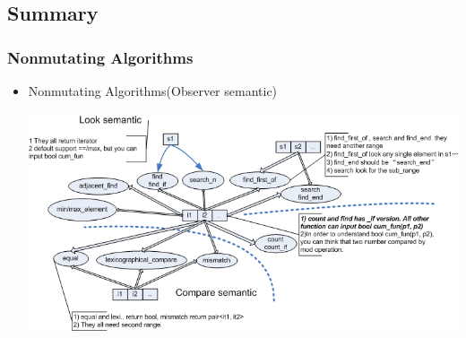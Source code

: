 \documentclass[a4paper,11pt,twoside]{book}
\begin{document}
\subsection{Summary}
\subsubsection{Nonmutating Algorithms}
\begin{itemize}
	\item Nonmutating Algorithms(Observer semantic)
	\begin{center}
		\includegraphics[width=0.85\linewidth]{pics/stl1.png}
	\end{center}
	
\end{itemize}
\end{document}
